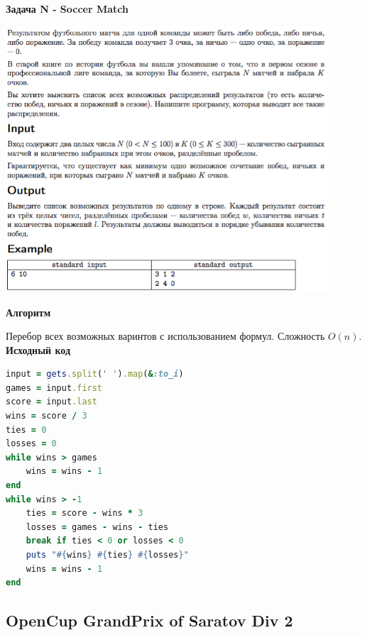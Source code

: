 \documentclass[a4paper,12pt]{article}
\begin{document}
\newpage
\textbf{{\large Задача N - Soccer Match}}

\begin{center}
\includegraphics[width=0.9\textwidth]{OC_Asia/N.png}\\ [1cm]
\end{center}

\textbf{{\large Алгоритм}}

Перебор всех возможных варинтов с использованием формул. Сложность $O(n)$. \\

\textbf{{\large Исходный код}} \\
\begin{lstlisting}[language=Ruby]
input = gets.split(' ').map(&:to_i)
games = input.first
score = input.last
wins = score / 3
ties = 0
losses = 0
while wins > games
    wins = wins - 1
end
while wins > -1
    ties = score - wins * 3
    losses = games - wins - ties
    break if ties < 0 or losses < 0
    puts "#{wins} #{ties} #{losses}"
    wins = wins - 1
end
\end{lstlisting}






%
%
\newpage
\subsection{OpenCup GrandPrix of Saratov Div 2}
\end{document}
